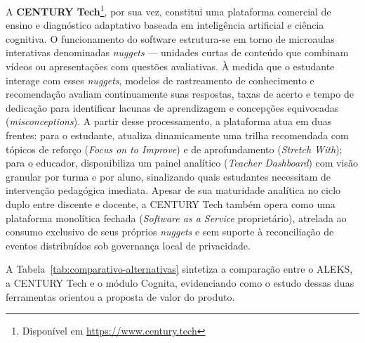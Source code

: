 A \textbf{CENTURY Tech}\footnote{Disponível em \url{https://www.century.tech}}, por sua vez, constitui uma plataforma comercial de ensino e diagnóstico adaptativo baseada em inteligência artificial e ciência cognitiva. O funcionamento do software estrutura-se em torno de microaulas interativas denominadas \textit{nuggets} — unidades curtas de conteúdo que combinam vídeos ou apresentações com questões avaliativas. À medida que o estudante interage com esses \textit{nuggets}, modelos de rastreamento de conhecimento e recomendação avaliam continuamente suas respostas, taxas de acerto e tempo de dedicação para identificar lacunas de aprendizagem e concepções equivocadas (\textit{misconceptions}). A partir desse processamento, a plataforma atua em duas frentes: para o estudante, atualiza dinamicamente uma trilha recomendada com tópicos de reforço (\textit{Focus on to Improve}) e de aprofundamento (\textit{Stretch With}); para o educador, disponibiliza um painel analítico (\textit{Teacher Dashboard}) com visão granular por turma e por aluno, sinalizando quais estudantes necessitam de intervenção pedagógica imediata. Apesar de sua maturidade analítica no ciclo duplo entre discente e docente, a CENTURY Tech também opera como uma plataforma monolítica fechada (\textit{Software as a Service} proprietário), atrelada ao consumo exclusivo de seus próprios \textit{nuggets} e sem suporte à reconciliação de eventos distribuídos sob governança local de privacidade.

A Tabela~\ref{tab:comparativo-alternativas} sintetiza a comparação entre o ALEKS, a CENTURY Tech e o módulo Cognita, evidenciando como o estudo dessas duas ferramentas orientou a proposta de valor do produto.

